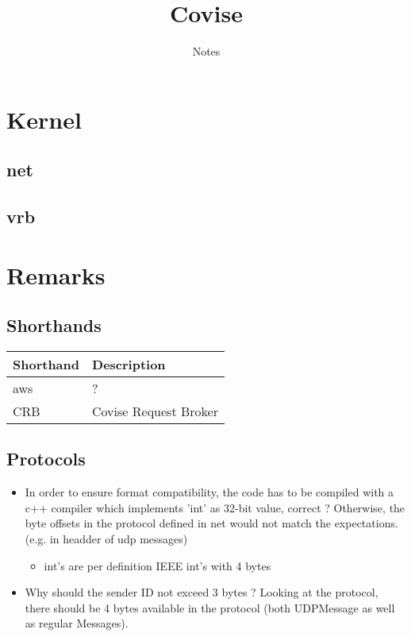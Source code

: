 \documentclass[12pt,pdftex,a4paper]{scrbook}
\newcommand{\shandentry}[2]{\label{intern::shorthands::#1} #1 & #2 \\ \hline}
\begin{document}
	\thispagestyle{empty}
	\title{Covise}
	\subtitle{Notes}
	\author{}
	\maketitle
	
	\newpage
	\tableofcontents

	\part{Kernel}
	
	\chapter{net}
	
	
	
	\chapter{vrb}

	

	\part{Remarks}

	\chapter{Shorthands}
	
	\begin{tabular}{||p{4cm}|p{10cm}||}
		\hline
		\textbf{Shorthand} & \textbf{Description}\\
		\hline
		\hline
		\shandentry{aws}{?}
		\shandentry{CRB}{Covise Request Broker}
	\end{tabular}

	\chapter{Protocols}

	\begin{itemize}
		\item In order to ensure format compatibility, the code has to be compiled with a c++ compiler which implements 'int' as 32-bit value, correct ? Otherwise, the byte offsets in the protocol defined in net would not match the expectations. (e.g. in headder of udp messages)
		\begin{itemize}
			\item int's are per definition IEEE int's with 4 bytes
		\end{itemize}
		\item Why should the sender ID not exceed 3 bytes ? Looking at the protocol, there should be 4 bytes available in the protocol (both UDPMessage as well as regular Messages). 
	\end{itemize}
\end{document}
